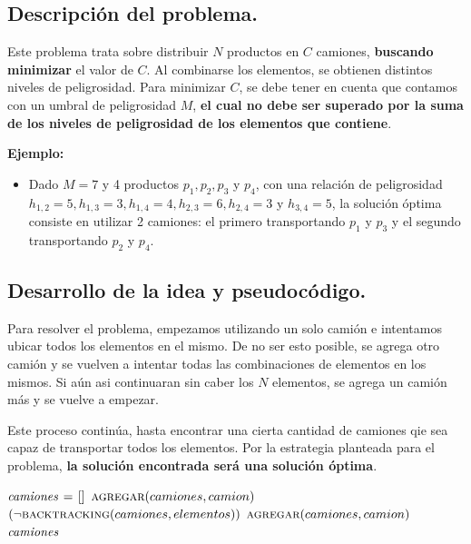 \subsection{Descripción del problema.}

\vspace*{0.3cm}

Este problema trata sobre distribuir $N$ productos en $C$ camiones, \textbf{buscando minimizar}
el valor de $C$. Al combinarse los elementos, se obtienen distintos niveles de peligrosidad.
Para minimizar $C$, se debe tener en cuenta que contamos con un umbral de peligrosidad
$M$, \textbf{el cual no debe ser superado por la suma de los niveles de peligrosidad de los
elementos que contiene}.

\vspace*{0.5cm}

\textbf{Ejemplo:}
\begin{itemize}
  \item Dado $M = 7$ y 4 productos $p_1, p_2, p_3$ y $p_4$, con una relación
  de peligrosidad $h_{1,2} = 5, h_{1,3} = 3, h_{1,4} = 4, h_{2,3} = 6, h_{2,4} =
  3$ y $h_{3,4} = 5$, la solución óptima consiste en utilizar 2 camiones: el primero
  transportando $p_1$ y $p_3$ y el segundo transportando $p_2$ y $p_4$.
\end{itemize}


\newpage
\subsection{Desarrollo de la idea y pseudocódigo.}

Para resolver el problema, empezamos utilizando un solo camión e intentamos ubicar
todos los elementos en el mismo. De no ser esto posible, se agrega otro camión y se vuelven
a intentar todas las combinaciones de elementos en los mismos. Si aún asi continuaran sin
caber los $N$ elementos, se agrega un camión más y se vuelve a empezar.

Este proceso continúa, hasta encontrar una cierta cantidad de camiones qie sea capaz de
transportar todos los elementos. Por la estrategia planteada para el problema,
\textbf{la solución encontrada será una solución óptima}.

\vspace*{0.5cm}


\begin{codebox}
\li $\id{camiones} \gets []$
\li $\textnormal{\scshape agregar}(camiones, camion)$
\li \While $(\neg\textnormal{\scshape backtracking}(camiones, elementos))$
\li     \Do
            $\textnormal{\scshape agregar}(camiones, camion)$
        \End
\li \Return $\id{camiones}$
\end{codebox}


